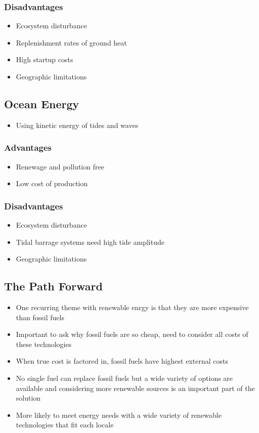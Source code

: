 \documentclass[11pt]{article}
\begin{document}
\subsubsection{Disadvantages}
\label{sec:org02d77bd}
\begin{itemize}
\item Ecosystem disturbance
\item Replenishment rates of ground heat
\item High startup costs
\item Geographic limitations
\end{itemize}
\subsection{Ocean Energy}
\label{sec:org51257e7}
\begin{itemize}
\item Using kinetic energy of tides and waves
\end{itemize}
\subsubsection{Advantages}
\label{sec:orgfc6afec}
\begin{itemize}
\item Renewage and pollution free
\item Low cost of production
\end{itemize}
\subsubsection{Disadvantages}
\label{sec:orga461c4c}
\begin{itemize}
\item Ecosystem disturbance
\item Tidal barrage systems need high tide amplitude
\item Geographic limitations
\end{itemize}
\subsection{The Path Forward}
\label{sec:org5a5558d}
\begin{itemize}
\item One recurring theme with renewable enrgy is that they are more expensive than fossil fuels
\item Important to ask why fossil fuels are so cheap, need to consider all costs of these technologies
\item When true cost is factored in, fossil fuels have highest external costs
\item No single fuel can replace fossil fuels but a wide variety of options are available and considering more renewable sources is an important part of the solution
\item More likely to meet energy needs with a wide variety of renewable technologies that fit each locale
\end{itemize}
\end{document}
